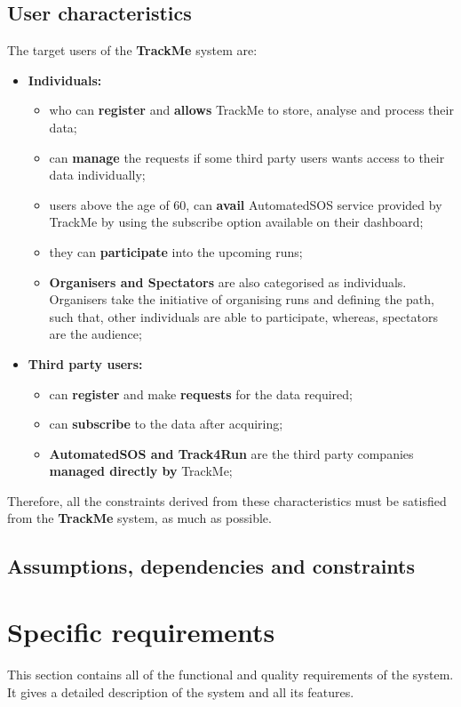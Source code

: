 \documentclass[12pt]{article}
\begin{document}
\subsection{User characteristics}
The target users of the \textbf{TrackMe} system are:
\begin{itemize}
\item{} \textbf{Individuals:} 
\begin{itemize}
\item{} who can \textbf{register} and \textbf{allows} TrackMe to store, analyse and process their data;
\item{} can \textbf{manage} the requests if some third party users wants access to their data individually;
\item{} users above the age of 60, can \textbf{avail} AutomatedSOS service provided by TrackMe by using the subscribe option available on their dashboard;
\item{} they can \textbf{participate} into the upcoming runs;
\item{} \textbf{Organisers and Spectators} are also categorised as individuals. Organisers take the initiative of organising runs and defining the path, such that, other individuals are able to participate, whereas, spectators are the audience;

\end{itemize}
\item{} \textbf{Third party users:}
\begin{itemize}
\item{} can \textbf{register} and make \textbf{requests} for the data required;
\item{} can \textbf{subscribe} to the data after acquiring;
\item{} \textbf{AutomatedSOS and Track4Run} are the third party companies \textbf{managed directly by} TrackMe;
\end{itemize}

\end{itemize}
Therefore, all the constraints derived from these characteristics must be satisfied from the \textbf{TrackMe} system, as much as possible.
\subsection{Assumptions, dependencies and constraints}

\section{Specific requirements}
This section contains all of the functional and quality requirements of the system. It gives a detailed
description of the system and all its features. 
\end{document}
